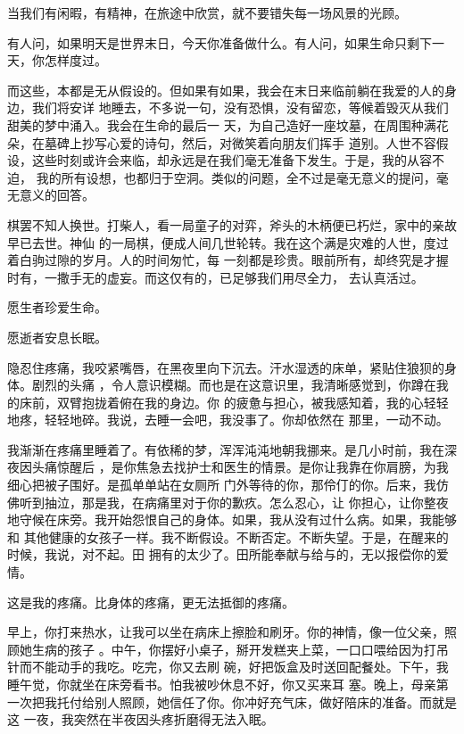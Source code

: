 \documentclass[12pt,a4paper]{article}
\begin{document}
		当我们有闲暇，有精神，在旅途中欣赏，就不要错失每一场风景的光顾。


		有人问，如果明天是世界末日，今天你准备做什么。有人问，如果生命只剩下一天，你怎样度过。

		而这些，本都是无从假设的。但如果有如果，我会在末日来临前躺在我爱的人的身边，我们将安详
	地睡去，不多说一句，没有恐惧，没有留恋，等候着毁灭从我们甜美的梦中涌入。我会在生命的最后一
	天，为自己造好一座坟墓，在周围种满花朵，在墓碑上抄写心爱的诗句，然后，对微笑着向朋友们挥手
	道别。人世不容假设，这些时刻或许会来临，却永远是在我们毫无准备下发生。于是，我的从容不迫，
	我的所有设想，也都归于空洞。类似的问题，全不过是毫无意义的提问，毫无意义的回答。


		棋罢不知人换世。打柴人，看一局童子的对弈，斧头的木柄便已朽烂，家中的亲故早已去世。神仙
	的一局棋，便成人间几世轮转。我在这个满是灾难的人世，度过着白驹过隙的岁月。人的时间匆忙，每
	一刻都是珍贵。眼前所有，却终究是才握时有，一撒手无的虚妄。而这仅有的，已足够我们用尽全力，
	去认真活过。


		愿生者珍爱生命。

		愿逝者安息长眠。

	\endwriting



		隐忍住疼痛，我咬紧嘴唇，在黑夜里向下沉去。汗水湿透的床单，紧贴住狼狈的身体。剧烈的头痛
	，令人意识模糊。而也是在这意识里，我清晰感觉到，你蹲在我的床前，双臂抱拢着俯在我的身边。你
	的疲惫与担心，被我感知着，我的心轻轻地疼，轻轻地碎。我说，去睡一会吧，我没事了。你却依然在
	那里，一动不动。

		我渐渐在疼痛里睡着了。有依稀的梦，浑浑沌沌地朝我挪来。是几小时前，我在深夜因头痛惊醒后
	，是你焦急去找护士和医生的情景。是你让我靠在你肩膀，为我细心把被子围好。是孤单单站在女厕所
	门外等待的你，那伶仃的你。后来，我仿佛听到抽泣，那是我，在病痛里对于你的歉疚。怎么忍心，让
	你担心，让你整夜地守候在床旁。我开始怨恨自己的身体。如果，我从没有过什么病。如果，我能够和
	其他健康的女孩子一样。我不断假设。不断否定。不断失望。于是，在醒来的时候，我说，对不起。田
	拥有的太少了。田所能奉献与给与的，无以报偿你的爱情。

		这是我的疼痛。比身体的疼痛，更无法抵御的疼痛。

		早上，你打来热水，让我可以坐在病床上擦脸和刷牙。你的神情，像一位父亲，照顾她生病的孩子
	。中午，你摆好小桌子，掰开发糕夹上菜，一口口喂给因为打吊针而不能动手的我吃。吃完，你又去刷
	碗，好把饭盒及时送回配餐处。下午，我睡午觉，你就坐在床旁看书。怕我被吵休息不好，你又买来耳
	塞。晚上，母亲第一次把我托付给别人照顾，她信任了你。你冲好充气床，做好陪床的准备。而就是这
	一夜，我突然在半夜因头疼折磨得无法入眠。
\end{document}

